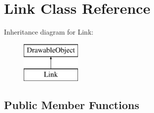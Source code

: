 \hypertarget{classLink}{}\section{Link Class Reference}
\label{classLink}
Inheritance diagram for Link\+:\begin{figure}[H]
\begin{center}
\leavevmode
\includegraphics[height=2.000000cm]{classLink}
\end{center}
\end{figure}
\subsection*{Public Member Functions}
